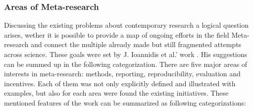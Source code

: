 		 
		\subsubsection{Areas of Meta-research}
		Discussing the existing problems about contemporary research a logical question arises, wether it is possible to provide a map of ongoing efforts in the field Meta-research and connect the multiple already made but still fragmented attempts across science. These goals were set by J. Ioannidis et al.' work \frqq \cite{Ioa15}. \newline
		His suggestions can be summed up in the following categorization. There are five major areas of interests in meta-research: methods, reporting, reproducibility, evaluation and incentives. Each of them was not only explicitly defined and illustrated with examples, but also for each area were found the existing initiatives. These mentioned features of the work can be summarized as following categorizations:
		\label{sec:AreasOfMetaresearch:cat}  
